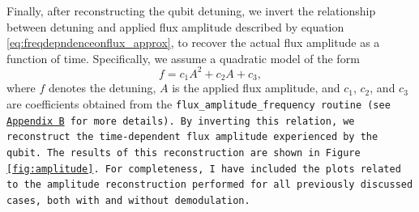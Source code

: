 Finally, after reconstructing the qubit detuning, we invert the relationship between detuning and applied flux amplitude described by equation \ref{eq:freqdepndenceonflux_approx}, to recover the actual flux amplitude as a function of time. 
Specifically, we assume a quadratic model of the form
\begin{equation}
    f = c_1 A^2 + c_2 A + c_3,
\end{equation}
where $f$ denotes the detuning, $A$ is the applied flux amplitude, and $c_1$, $c_2$, and $c_3$ are coefficients obtained from the \tt{flux\_amplitude\_frequency} routine (see \hyperref[app:AppendixB]{Appendix B} for more details). 
By inverting this relation, we reconstruct the time-dependent flux amplitude experienced by the qubit. 
The results of this reconstruction are shown in Figure \ref{fig:amplitude}.
For completeness, I have included the plots related to the amplitude reconstruction performed for all previously discussed cases, both with and without demodulation.

